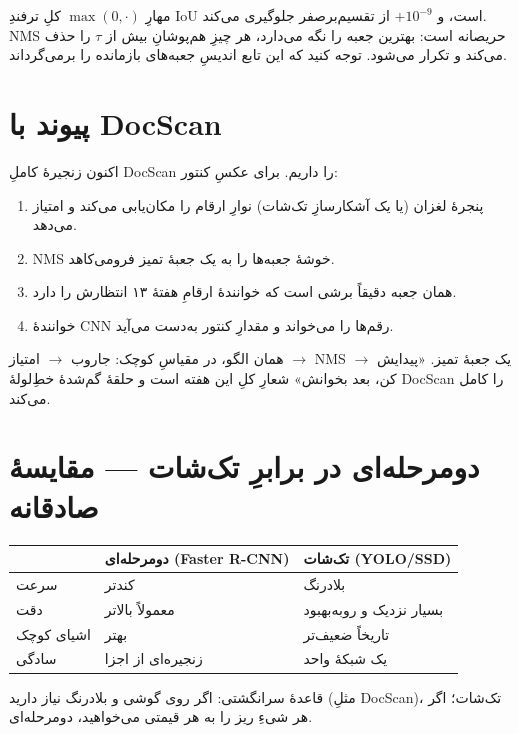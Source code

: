 \documentclass[12pt,a4paper]{article}
\begin{document}
مهارِ $\max(0,\cdot)$ کلِ ترفندِ IoU است، و $+10^{-9}$ از تقسیم‌بر‌صفر جلوگیری می‌کند. NMS حریصانه است: بهترین جعبه را نگه می‌دارد، هر چیزِ هم‌پوشانِ بیش از $\tau$ را حذف می‌کند و تکرار می‌شود. توجه کنید که این تابع اندیسِ جعبه‌های بازمانده را برمی‌گرداند.

\section{پیوند با DocScan}

اکنون زنجیرهٔ کاملِ DocScan را داریم. برای عکسِ کنتور:

\begin{enumerate}
  \item پنجرهٔ لغزان (یا یک آشکارسازِ تک‌شات) نوارِ ارقام را مکان‌یابی می‌کند و امتیاز می‌دهد.
  \item NMS خوشهٔ جعبه‌ها را به یک جعبهٔ تمیز فرومی‌کاهد.
  \item همان جعبه دقیقاً برشی است که خوانندهٔ ارقامِ هفتهٔ ۱۳ انتظارش را دارد.
  \item خوانندهٔ CNN رقم‌ها را می‌خواند و مقدارِ کنتور به‌دست می‌آید.
\end{enumerate}

\begin{nokte}
همان الگو، در مقیاسِ کوچک: جاروب $\to$ امتیاز $\to$ NMS $\to$ یک جعبهٔ تمیز. «پیدایش کن، بعد بخوانش» شعارِ کلِ این هفته است و حلقهٔ گم‌شدهٔ خطِ‌لولهٔ DocScan را کامل می‌کند.
\end{nokte}

\section{دومرحله‌ای در برابرِ تک‌شات — مقایسهٔ صادقانه}

\begin{center}
\begin{tabular}{@{}lll@{}}
\hline
 & \textbf{دومرحله‌ای (Faster R-CNN)} & \textbf{تک‌شات (YOLO/SSD)} \\
\hline
سرعت      & کندتر & بلادرنگ \\
دقت       & معمولاً بالاتر & بسیار نزدیک و روبه‌بهبود \\
اشیای کوچک & بهتر & تاریخاً ضعیف‌تر \\
سادگی      & زنجیره‌ای از اجزا & یک شبکهٔ واحد \\
\hline
\end{tabular}
\end{center}

قاعدهٔ سرانگشتی: اگر روی گوشی و بلادرنگ نیاز دارید (مثلِ DocScan)، تک‌شات؛ اگر هر شیءِ ریز را به هر قیمتی می‌خواهید، دومرحله‌ای.
\end{document}
